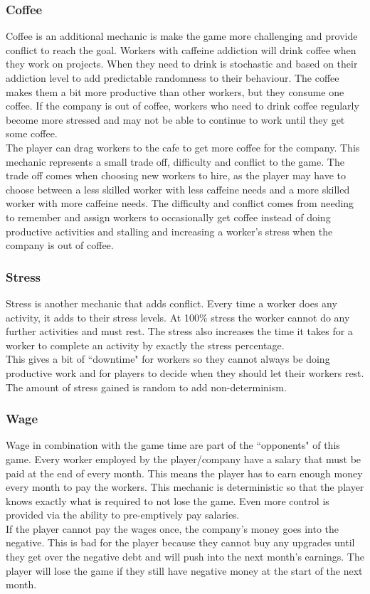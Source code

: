 \documentclass[11pt]{article}
\newcommand{\n}[0]{\\[\baselineskip]}
\begin{document}
\subsubsection{Coffee}\label{sec:rules-coffee}
Coffee is an additional mechanic is make the game more challenging and provide conflict to reach the goal. Workers with caffeine addiction will drink coffee when they work on projects. When they need to drink is stochastic and based on their addiction level to add predictable randomness to their behaviour. The coffee makes them a bit more productive than other workers, but they consume one coffee. If the company is out of coffee, workers who need to drink coffee regularly become more stressed and may not be able to continue to work until they get some coffee. 
\n
The player can drag workers to the cafe to get more coffee for the company. This mechanic represents a small trade off, difficulty and conflict to the game. The trade off comes when choosing new workers to hire, as the player may have to choose between a less skilled worker with less caffeine needs and a more skilled worker with more caffeine needs. The difficulty and conflict comes from needing to remember and assign workers to occasionally get coffee instead of doing productive activities and stalling and increasing a worker's stress when the company is out of coffee. 

\subsubsection{Stress}
Stress is another mechanic that adds conflict. Every time a worker does any activity, it adds to their stress levels. At 100\% stress the worker cannot do any further activities and must rest. The stress also increases the time it takes for a worker to complete an activity by exactly the stress percentage. 
\n
This gives a bit of ``downtime" for workers so they cannot always be doing productive work and for players to decide when they should let their workers rest. The amount of stress gained is random to add non-determinism.

\subsubsection{Wage}
Wage in combination with the game time are part of the ``opponents" of this game. Every worker employed by the player/company have a salary that must be paid at the end of every month. This means the player has to earn enough money every month to pay the workers. This mechanic is deterministic so that the player knows exactly what is required to not lose the game. Even more control is provided via the ability to pre-emptively pay salaries. 
\n
If the player cannot pay the wages once, the company's money goes into the negative. This is bad for the player because they cannot buy any upgrades until they get over the negative debt and will push into the next month's earnings. The player will lose the game if they still have negative money at the start of the next month. 
\end{document}
